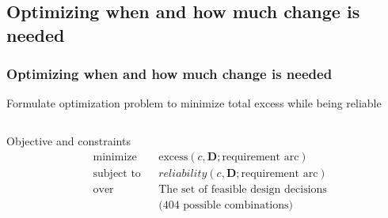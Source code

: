 \subsection{Optimizing when and how much change is needed}
\begin{frame}[t]
	\frametitle{Optimizing when and how much change is needed}
	\vspace{-0.5em}
	Formulate optimization problem to minimize total excess while being reliable
	
	\begin{columns}[t] %
		
		\begin{column}{.42\textwidth} %
			\vspace{-1.5em}
			\begin{alertblock}{Objective and constraints}
				\vspace{-1.5em}
				\begin{equation*}
					\begin{aligned}
						& {\text{minimize}}
						& & \text{excess}(c,\mathbf{D};\text{requirement arc})\\
						& \text{subject to}
						& & reliability(c,\mathbf{D};\text{requirement arc})\\
						& \text{over}
						& & \text{The set of feasible design decisions}\\
						& & & \text{(404 possible combinations)}
					\end{aligned}
				\end{equation*}
			\end{alertblock}
			\vspace{-0.5em}
			\vspace{-0.5em}
		\end{column}


\end{columns}
\end{frame}
